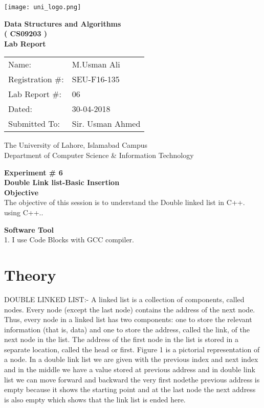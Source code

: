 \documentclass[11pt]{article}            %
\begin{document}
\begin{titlepage}
    \centering
  \vfill
    \texttt{[image: uni\_logo.png]} \\ 
	\vskip2cm
    {\bfseries\Large
	Data Structures and Algorithms \\ ( CS09203 )\\
	
	\vskip2cm
	Lab Report 
	 
	\vskip2cm
	}    


\begin{center}
\begin{tabular}{ l l  } 

Name: & M.Usman Ali \\ 
Registration \#: & SEU-F16-135 \\ 
Lab Report \#: & 06 \\ 
 Dated:& 30-04-2018\\ 
Submitted To:& Sir. Usman Ahmed\\ 

\end{tabular}
\end{center}
    \vfill
    The University of Lahore, Islamabad Campus\\
Department of Computer Science \& Information Technology
\end{titlepage}


    
    {\bfseries\Large
\centering
	Experiment \# 6 \\

Double Link list-Basic Insertion \\
	
	}    
 \vskip1cm
 \textbf {Objective}\\The objective of this session is to understand the Double linked list in C++.
using C++.. 
 
 \textbf {Software Tool}\\
1.  I use Code Blocks with GCC compiler.\\

\section{Theory }          DOUBLE  LINKED LIST:-
A linked list is a collection of components, called nodes. Every node (except the last node)
contains the address of the next node. Thus, every node in a linked list has two components:
one to store the relevant information (that is, data) and one to store the address, called the link,
of the next node in the list. The address of the first node in the list is stored in a separate
location, called the head or first. Figure 1 is a pictorial representation of a node.
In a double link list we are given with the previous index and next index and in the middle we have a value stored at previous address and in double link list we can move forward and backward the very first nodethe previous address is empty because it shows the starting point and at the last node the next address is also empty which shows that the link list is ended here.   
\end{document}
